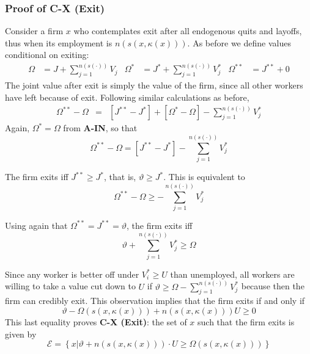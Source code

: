 \subsubsection{Proof of C-X (Exit)}

Consider a firm $x$ who contemplates exit after all endogenous quits and
layoffs, thus when its employment is $n\left( s\left( x,\kappa \left(
x\right) \right) \right) $. As before we define values conditional on
exiting:
\begin{align*}
\Omega & =J+\sum_{j=1}^{n\left( s\left( \cdot \right) \right) }V_{j} &
\Omega ^{\ast }& =J^{\ast }+\sum_{j=1}^{n\left( s\left( \cdot \right)
\right) }V_{j}^{\ast } &
\Omega ^{\ast \ast }& =J^{\ast \ast }+0
\end{align*}%
The joint value after exit is simply the value of the firm,
since all other workers have left because of exit. Following similar calculations as before,
\begin{eqnarray*}
\Omega ^{\ast \ast }-\Omega&=&\left[ J^{\ast \ast
}-J^{\ast }\right] +[\Omega ^{\ast }-\Omega ]-\sum_{j=1}^{n\left( s\left(
\cdot \right) \right) }V_{j}^{\ast }
\end{eqnarray*}
Again, $ \Omega ^{\ast }=\Omega $ from \textbf{A-IN}, so that
\begin{equation*}
\Omega ^{\ast \ast }-\Omega =\left[ J^{\ast \ast }-J^{\ast }\right]
-\sum_{j=1}^{n\left( s\left( \cdot \right) \right) }V_{j}^{\ast }
\end{equation*}

The firm exits iff $J^{\ast \ast }\geq J^{\ast }$, that is, $\vartheta \geq
J^{\ast }$. This is equivalent to
\begin{equation*}
\Omega ^{\ast \ast }-\Omega \geq -\sum_{j=1}^{n\left( s\left( \cdot \right)
\right) }V_{j}^{\ast }
\end{equation*}

Using again that $\Omega ^{\ast \ast }=J^{\ast \ast }=\vartheta $, the firm
exits iff
\begin{equation*}
\vartheta +\sum_{j=1}^{n\left( s\left( \cdot \right) \right) }V_{j}^{\ast
}\geq \Omega
\end{equation*}

Since any worker is better off under $V_{i}^{\ast }\geq U$ than unemployed, all workers are willing to take a value cut down to $U$
if $\vartheta \geq \Omega - \sum_{j=1}^{n\left( s\left( \cdot \right) \right)}V_{j}^{\ast }$ because then the firm can credibly exit. This observation implies that the firm exits if and only if
\begin{equation*}
\vartheta -\Omega \left( s\left( x,\kappa \left( x\right) \right) \right)
+n\left( s\left( x,\kappa \left( x\right) \right) \right) U\geq 0
\end{equation*}
This last equality proves \textbf{C-X (Exit)}: the set of $x$ such that the firm exits is
given by
\begin{equation*}
\mathcal{E}=\left\{ x\Big|\vartheta +n\left( s\left( x,\kappa \left(
x\right) \right) \right) \cdot U\geq \Omega \left( s\left( x,\kappa \left(
x\right) \right) \right) \right\}
\end{equation*}


